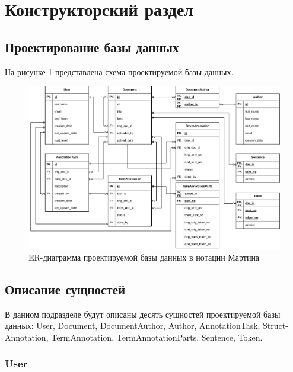 \section{Конструкторский раздел}

\subsection{Проектирование базы данных}

На рисунке \ref{fig:erd} представлена схема проектируемой базы данных.

\begin{figure}[H]
	\centering
	\includegraphics[width=\textwidth]{diag/erd-v3.pdf}
	\caption{ER-диаграмма проектируемой базы данных в нотации Мартина}
	\label{fig:erd}
\end{figure}

\subsection{Описание сущностей}

В данном подразделе будут описаны десять сущностей проектируемой базы данных: User, Document, DocumentAuthor, Author, AnnotationTask, Struct-Annotation, TermAnnotation, TermAnnotationParts, Sentence, Token.

\subsubsection*{User}

